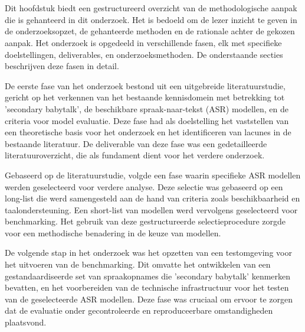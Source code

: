 
\chapter{}%
\label{ch:methodologie}

Dit hoofdstuk biedt een gestructureerd overzicht van de methodologische aanpak die is gehanteerd in dit onderzoek. Het is bedoeld om de lezer inzicht te geven in de onderzoeksopzet, de gehanteerde methoden en de rationale achter de gekozen aanpak. Het onderzoek is opgedeeld in verschillende fasen, elk met specifieke doelstellingen, deliverables, en onderzoeksmethoden. De onderstaande secties beschrijven deze fasen in detail.

De eerste fase van het onderzoek bestond uit een uitgebreide literatuurstudie, gericht op het verkennen van het bestaande kennisdomein met betrekking tot 'secondary babytalk', de beschikbare spraak-naar-tekst (ASR) modellen, en de criteria voor model evaluatie. Deze fase had als doelstelling het vaststellen van een theoretische basis voor het onderzoek en het identificeren van lacunes in de bestaande literatuur. De deliverable van deze fase was een gedetailleerde literatuuroverzicht, die als fundament dient voor het verdere onderzoek.

Gebaseerd op de literatuurstudie, volgde een fase waarin specifieke ASR modellen werden geselecteerd voor verdere analyse. Deze selectie was gebaseerd op een long-list die werd samengesteld aan de hand van criteria zoals beschikbaarheid en taalondersteuning. Een short-list van modellen werd vervolgens geselecteerd voor benchmarking. Het gebruik van deze gestructureerde selectieprocedure zorgde voor een methodische benadering in de keuze van modellen.

De volgende stap in het onderzoek was het opzetten van een testomgeving voor het uitvoeren van de benchmarking. Dit omvatte het ontwikkelen van een gestandaardiseerde set van spraakopnames die 'secondary babytalk' kenmerken bevatten, en het voorbereiden van de technische infrastructuur voor het testen van de geselecteerde ASR modellen. Deze fase was cruciaal om ervoor te zorgen dat de evaluatie onder gecontroleerde en reproduceerbare omstandigheden plaatsvond.

